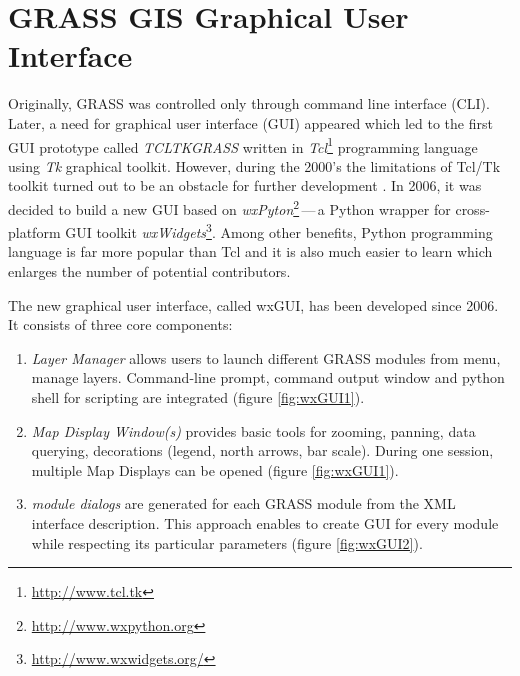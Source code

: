 \documentclass[a4paper,12pt,oneside]{book}
\newcommand{\dash}{\mbox{\,---\,}}
\begin{document}
\section{GRASS GIS Graphical User Interface}
\label{sec:grasswxgui}
Originally, GRASS was controlled only through command line interface (CLI).
Later, a need for graphical user interface (GUI) appeared
which led to the first GUI prototype called \emph{TCLTKGRASS}
written in \emph{Tcl}\footnote{\url{http://www.tcl.tk}}
programming language using \emph{Tk} graphical toolkit.
However, during the 2000's the limitations of Tcl/Tk toolkit turned out to be
an obstacle for further development \cite{wxGUI2008}.
In 2006, it was decided to build a new GUI based on
\emph{wxPyton}\footnote{\url{http://www.wxpython.org}}\dash  a Python wrapper
for cross-platform GUI toolkit \emph{wxWidgets}\footnote{\url{http://www.wxwidgets.org/}}.
Among other benefits, Python programming language is far more popular than Tcl
and it is also much easier to learn which enlarges the number of potential contributors.

The new graphical user interface, called wxGUI, has been developed since 2006.
It consists of three core components:
    \begin{enumerate}
      \item \emph{Layer Manager} allows users to launch different GRASS modules from menu,
      manage layers. Command-line prompt, command output window and python shell
      for scripting are integrated (figure \ref{fig:wxGUI1}).
      \item \emph{Map Display Window(s)} provides basic tools for zooming, panning, data querying,
      decorations (legend, north arrows, bar scale).
      During one session, multiple Map Displays can be opened (figure \ref{fig:wxGUI1}).
      \item \emph{module dialogs} are generated for each GRASS module from the XML interface description.
      This approach enables to create GUI for every module while respecting its particular parameters
      (figure \ref{fig:wxGUI2}).
    \end{enumerate}
\end{document}
